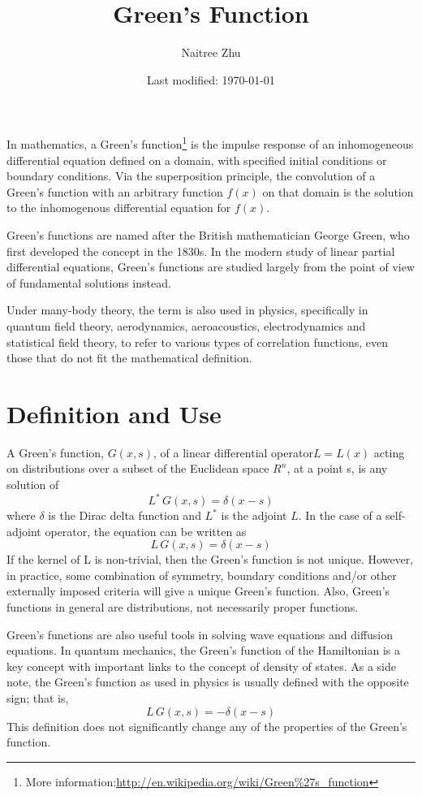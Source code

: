 \documentclass[a4paper]{article}
\title{Green's Function}
\author{Naitree Zhu}
\date{Last modified: \today}
\begin{document}
\maketitle
In mathematics, a Green's function\footnote{More information:\url{http://en.wikipedia.org/wiki/Green\%27s_function}} is the impulse response of an inhomogeneous differential equation defined on a domain, with specified initial conditions or boundary conditions. Via the superposition principle, the convolution of a Green's function with an arbitrary function $f(x)$ on that domain is the solution to the inhomogenous differential equation for $f(x)$.

Green's functions are named after the British mathematician George Green, who first developed the concept in the 1830s. In the modern study of linear partial differential equations, Green's functions are studied largely from the point of view of fundamental solutions instead.

Under many-body theory, the term is also used in physics, specifically in quantum field theory, aerodynamics, aeroacoustics, electrodynamics and statistical field theory, to refer to various types of correlation functions, even those that do not fit the mathematical definition.
\part{Definition and Use}
A Green's function, $G(x,s)$, of a linear differential operator$L=L(x)$ acting on distributions over a subset of the Euclidean space $R^{n}$, at a point s, is any solution of 
\begin{equation}
L^{*}\,G(x,s)=\delta(x-s)
\end{equation}
where $\delta$ is the Dirac delta function and $L^{*}$ is the adjoint $L$. In the case of a self-adjoint operator, the equation can be written as 
\begin{equation}
L\,G(x,s)=\delta(x-s)
\end{equation}
If the kernel of L is non-trivial, then the Green's function is not unique. However, in practice, some combination of symmetry, boundary conditions and/or other externally imposed criteria will give a unique Green's function. Also, Green's functions in general are distributions, not necessarily proper functions.

Green's functions are also useful tools in solving wave equations and diffusion equations. In quantum mechanics, the Green's function of the Hamiltonian is a key concept with important links to the concept of density of states. As a side note, the Green's function as used in physics is usually defined with the opposite sign; that is,
\begin{equation}
L\,G(x,s)=-\delta(x-s)
\end{equation}
This definition does not significantly change any of the properties of the Green's function.
\end{document}
